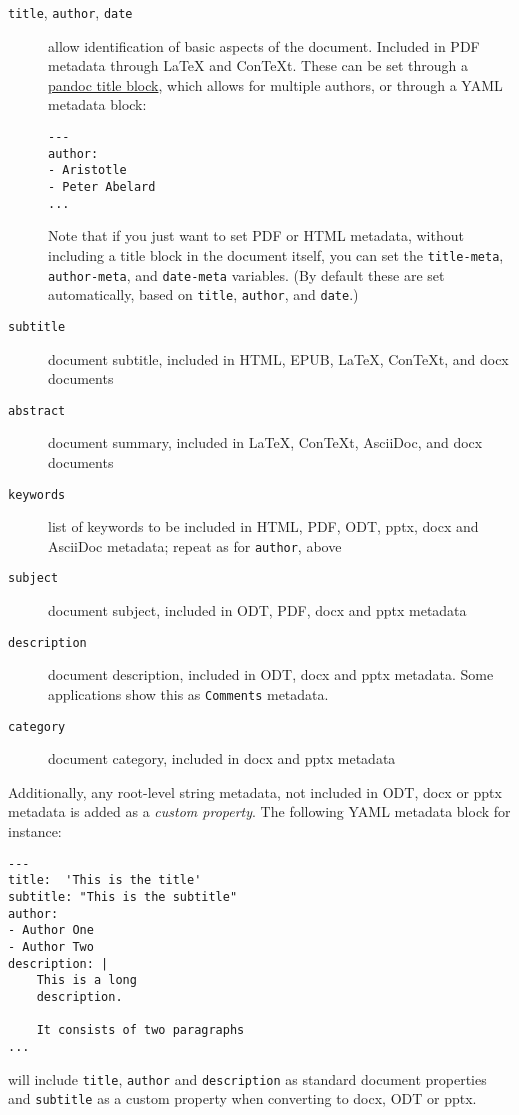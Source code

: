 \documentclass[
  12pt,
  a4paper,
]{article}
\begin{document}
\begin{description}
\item[\texttt{title}, \texttt{author}, \texttt{date}]
allow identification of basic aspects of the document. Included in PDF metadata through LaTeX and
ConTeXt. These can be set through a \protect\hyperlink{extension-pandoc_title_block}{pandoc title
block}, which allows for multiple authors, or through a YAML metadata block:

\begin{verbatim}
---
author:
- Aristotle
- Peter Abelard
...
\end{verbatim}

Note that if you just want to set PDF or HTML metadata, without including a title block in the
document itself, you can set the \texttt{title-meta}, \texttt{author-meta}, and \texttt{date-meta}
variables. (By default these are set automatically, based on \texttt{title}, \texttt{author}, and
\texttt{date}.)
\item[\texttt{subtitle}]
document subtitle, included in HTML, EPUB, LaTeX, ConTeXt, and docx documents
\item[\texttt{abstract}]
document summary, included in LaTeX, ConTeXt, AsciiDoc, and docx documents
\item[\texttt{keywords}]
list of keywords to be included in HTML, PDF, ODT, pptx, docx and AsciiDoc metadata; repeat as for
\texttt{author}, above
\item[\texttt{subject}]
document subject, included in ODT, PDF, docx and pptx metadata
\item[\texttt{description}]
document description, included in ODT, docx and pptx metadata. Some applications show this as
\texttt{Comments} metadata.
\item[\texttt{category}]
document category, included in docx and pptx metadata
\end{description}

Additionally, any root-level string metadata, not included in ODT, docx or pptx metadata is added
as a \emph{custom property}. The following YAML metadata block for instance:

\begin{verbatim}
---
title:  'This is the title'
subtitle: "This is the subtitle"
author:
- Author One
- Author Two
description: |
    This is a long
    description.

    It consists of two paragraphs
...
\end{verbatim}

will include \texttt{title}, \texttt{author} and \texttt{description} as standard document
properties and \texttt{subtitle} as a custom property when converting to docx, ODT or pptx.
\end{document}
